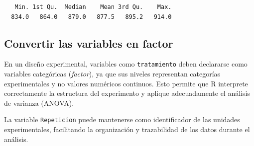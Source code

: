 \documentclass[
  spanish,
  letterpaper,
  DIV=11,
  numbers=noendperiod]{scrreprt}
\newenvironment{Shaded}{\begin{snugshade}}{\end{snugshade}}
\newcommand{\CommentTok}[1]{\textcolor[rgb]{0.37,0.37,0.37}{#1}}
\newcommand{\FunctionTok}[1]{\textcolor[rgb]{0.28,0.35,0.67}{#1}}
\newcommand{\NormalTok}[1]{\textcolor[rgb]{0.00,0.23,0.31}{#1}}
\newcommand{\OtherTok}[1]{\textcolor[rgb]{0.00,0.23,0.31}{#1}}
\newcommand{\SpecialCharTok}[1]{\textcolor[rgb]{0.37,0.37,0.37}{#1}}
\newcommand{\StringTok}[1]{\textcolor[rgb]{0.13,0.47,0.30}{#1}}
\begin{document}
\begin{Shaded}
\end{Shaded}

\begin{verbatim}
   Min. 1st Qu.  Median    Mean 3rd Qu.    Max. 
  834.0   864.0   879.0   877.5   895.2   914.0 
\end{verbatim}

\subsection{Convertir las variables en
factor}\label{convertir-las-variables-en-factor}

En un diseño experimental, variables como \texttt{tratamiento} deben
declararse como variables categóricas (\emph{factor}), ya que sus
niveles representan categorías experimentales y no valores numéricos
continuos. Esto permite que R interprete correctamente la estructura del
experimento y aplique adecuadamente el análisis de varianza (ANOVA).

La variable \texttt{Repeticion} puede mantenerse como identificador de
las unidades experimentales, facilitando la organización y trazabilidad
de los datos durante el análisis.

\begin{Shaded}
\end{Shaded}
\end{document}
